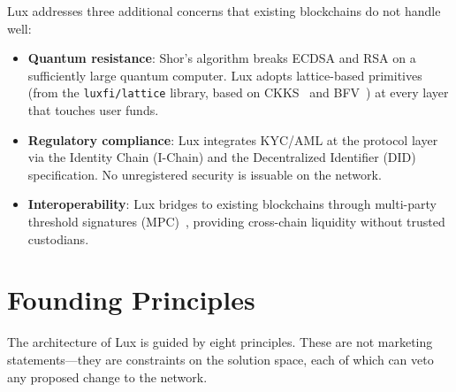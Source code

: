 \documentclass[11pt,a4paper]{article}
\begin{document}
Lux addresses three additional concerns that existing blockchains do
not handle well:

\begin{itemize}[nosep]
  \item \textbf{Quantum resistance}: Shor's algorithm breaks ECDSA and
        RSA on a sufficiently large quantum computer. Lux adopts
        lattice-based primitives (from the \texttt{luxfi/lattice}
        library, based on CKKS~\cite{ckks} and BFV~\cite{bfv}) at
        every layer that touches user funds.
  \item \textbf{Regulatory compliance}: Lux integrates KYC/AML at the
        protocol layer via the Identity Chain (I-Chain) and the
        Decentralized Identifier (DID) specification. No unregistered
        security is issuable on the network.
  \item \textbf{Interoperability}: Lux bridges to existing blockchains
        through multi-party threshold signatures
        (MPC)~\cite{threshold-mpc}, providing cross-chain liquidity
        without trusted custodians.
\end{itemize}

\section{Founding Principles}

The architecture of Lux is guided by eight principles. These are not
marketing statements---they are constraints on the solution space,
each of which can veto any proposed change to the network.
\end{document}
